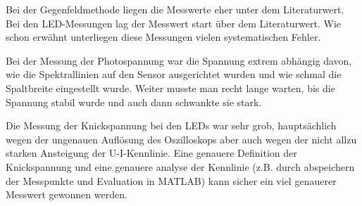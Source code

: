 Bei   der    Gegenfeldmethode    liegen   die   Messwerte   eher   unter   dem
Literaturwert\cite{ref:h}. Bei den LED-Messungen lag der Messwert start \"uber
dem  Literaturwert. Wie schon erw\"ahnt  unterliegen  diese  Messungen  vielen
systematischen Fehler.

Bei der Messung der Photospannung war die Spannung  extrem  abh\"angig  davon,
wie die Spektrallinien auf den Sensor  ausgerichtet  wurden und wie schmal die
Spaltbreite eingestellt wurde. Weiter  musste  man recht lange warten, bis die
Spannung stabil wurde und auch dann schwankte sie stark.

Die Messung der Knickspannung bei den  LEDs  war  sehr  grob,  haupts\"achlich
wegen der ungenauen Aufl\"osung des Oszilloskops  aber  auch  wegen  der nicht
allzu  starken Ansteigung der  U-I-Kennlinie.  Eine  genauere  Definition  der
Knickspannung und eine genauere analyse der Kennlinie  (z.B. durch abspeichern
der  Messpunkte  und  Evaluation in MATLAB) kann  sicher  ein  viel  genauerer
Messwert gewonnen werden.

